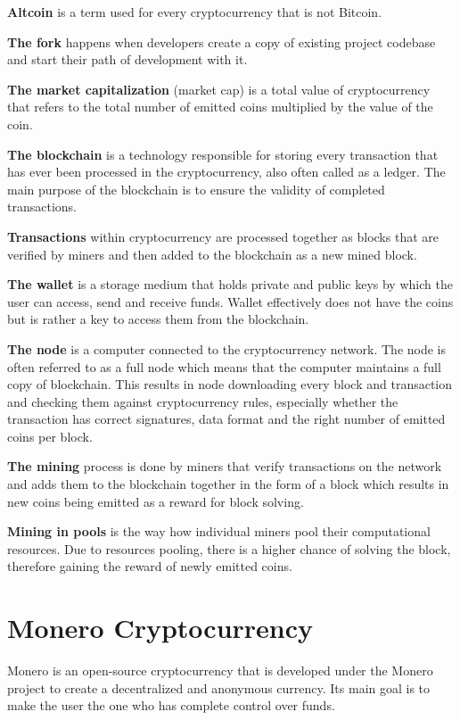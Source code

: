 \documentclass[
  printed, %
  table,   %
  lof,     %
  lot,     %
           oneside, color
]{fithesis3}
\begin{document}
\textbf{Altcoin} is a term used for every cryptocurrency that is not Bitcoin.

\textbf{The fork} happens when developers create a copy of existing project codebase and start their path of development with it. 

\textbf{The market capitalization} (market cap) is a total value of cryptocurrency that refers to the total number of emitted coins multiplied by the value of the coin.

\textbf{The blockchain} is a technology responsible for storing every transaction that has ever been processed in the cryptocurrency, also often called as a ledger. The main purpose of the blockchain is to ensure the validity of completed transactions.

\textbf{Transactions} within cryptocurrency are processed together as blocks that are verified by miners and then added to the blockchain as a new mined block.

\textbf{The wallet} is a storage medium that holds private and public keys by which the user can access, send and receive funds. Wallet effectively does not have the coins but is rather a key to access them from the blockchain.

\textbf{The node} is a computer connected to the cryptocurrency network. The node is often referred to as a full node which means that the computer maintains a full copy of blockchain. This results in node downloading every block and transaction and checking them against cryptocurrency rules, especially whether the transaction has correct signatures, data format and the right number of emitted coins per block.

\textbf{The mining} process is done by miners that verify transactions on the network and adds them to the blockchain together in the form of a block which results in new coins being emitted as a reward for block solving.

\textbf{Mining in pools} is the way how individual miners pool their computational resources. Due to resources pooling, there is a higher chance of solving the block, therefore gaining the reward of newly emitted coins. %

\chapter{Monero Cryptocurrency}
Monero is an open-source cryptocurrency that is developed under the Monero project to create a decentralized and anonymous currency. Its main goal is to make the user the one who has complete control over funds.
\end{document}
